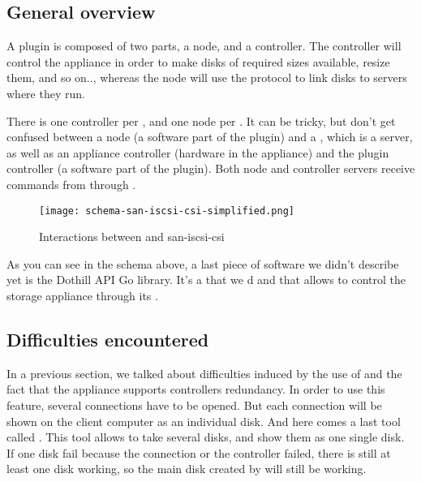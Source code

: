 \subsection{General overview}

A  plugin is composed of two parts, a node, and a controller. The controller will control the appliance in order to make disks of required sizes available, resize them, and so on.., whereas the node will use the  protocol to link disks to servers where they run.

There is one controller per , and one node per  . It can be tricky, but don't get confused between a  node (a software part of the plugin) and a  , which is a server, as well as an appliance controller (hardware in the appliance) and the plugin controller (a software part of the plugin). Both node and controller servers receive  commands from  through .

\begin{figure}[h]
    \centering
    \texttt{[image: schema-san-iscsi-csi-simplified.png]}
    \caption{Interactions between  and \gls{san-iscsi-csi}}
    \label{fig:k8s-san-scsi-csi}
\end{figure}

As you can see in the schema above, a last piece of software we didn't describe yet is the Dothill API Go library. It's a  that we d and that allows to control the storage appliance through its .

\subsection{Difficulties encountered}

In a previous section, we talked about difficulties induced by the use of  and the fact that the appliance supports controllers redundancy. In order to use this feature, several  connections have to be opened. But each connection will be shown on the client computer as an individual disk. And here comes a last tool called . This tool allows to take several disks, and show them as one single disk. If one disk fail because the connection or the controller failed, there is still at least one disk working, so the main disk created by  will still be working.

